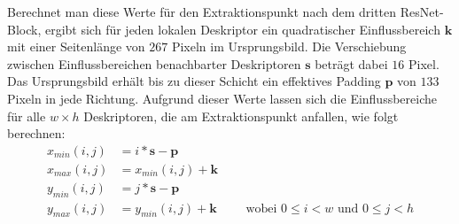 Berechnet man diese Werte für den Extraktionspunkt nach dem dritten ResNet-Block, ergibt sich für jeden lokalen Deskriptor ein quadratischer Einflussbereich $\mathbf{k}$ mit einer Seitenlänge von $267$ Pixeln im Ursprungsbild. Die Verschiebung zwischen Einflussbereichen benachbarter Deskriptoren $\mathbf{s}$ beträgt dabei $16$ Pixel. Das Ursprungsbild erhält bis zu dieser Schicht ein effektives Padding $\mathbf{p}$ von $133$ Pixeln in jede Richtung. Aufgrund dieser Werte lassen sich die Einflussbereiche für alle $w \times h$ Deskriptoren, die am Extraktionspunkt anfallen, wie folgt berechnen:
\begin{align}
x_{min}(i,j) &= i*\mathbf{s} - \mathbf{p} 
\\
x_{max}(i,j) &= x_{min}(i,j) + \mathbf{k}
\\ 
y_{min}(i,j) &= j*\mathbf{s} - \mathbf{p}
\\ 
y_{max}(i,j) &= y_{min}(i,j) + \mathbf{k} \qquad\text{ wobei } 0\leq i < w \text{ und } 0\leq j < h
\end{align}

